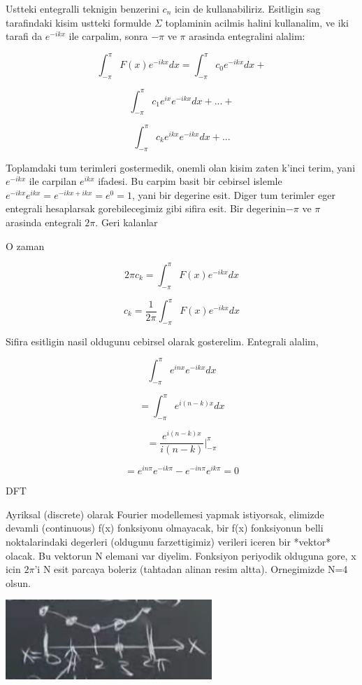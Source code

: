 \documentclass[12pt,fleqn]{article}\usepackage{../common}
\begin{document}
Ustteki entegralli teknigin benzerini $c_n$ icin de
kullanabiliriz. Esitligin sag tarafindaki kisim ustteki formulde
$\Sigma$ toplaminin acilmis halini kullanalim, ve iki tarafi da
$e^{-ikx}$ ile carpalim, sonra $-\pi$ ve $\pi$ arasinda entegralini
alalim:

$$ \int_{-\pi}^{\pi}F(x)e^{-ikx}dx = \int_{-\pi}^{\pi}c_0e^{-ikx}dx + $$

$$ \int_{-\pi}^{\pi}c_1e^{ix}e^{-ikx}dx + ... +  $$

$$ \int_{-\pi}^{\pi}c_ke^{ikx}e^{-ikx}dx + ... $$

Toplamdaki tum terimleri gostermedik, onemli olan kisim zaten k'inci terim, yani
$e^{-ikx}$ ile carpilan $e^{ikx}$ ifadesi. Bu carpim basit bir cebirsel islemle
$e^{-ikx}e^{ikx} = e^{-ikx + ikx} = e^{0} = 1$, yani bir degerine esit. Diger
tum terimler eger entegrali hesaplarsak gorebilecegimiz gibi sifira esit. Bir
degerinin$-\pi$ ve $\pi$ arasinda entegrali $2\pi$. Geri kalanlar

O zaman

$$ 2\pi c_k = \int_{-\pi}^{\pi}F(x)e^{-ikx}dx $$

$$ c_k = \frac{1}{2\pi}\int_{-\pi}^{\pi}F(x)e^{-ikx}dx $$

Sifira esitligin nasil oldugunu cebirsel olarak gosterelim. Entegrali alalim,

$$ \int_{-\pi}^{\pi}e^{inx}e^{-ikx}dx $$

$$ = \int_{-\pi}^{\pi}e^{i(n-k)x}dx $$

$$ = \frac{e^{i(n-k)x}}{i(n-k)} \bigg|_{-\pi}^{\pi}  $$

$$ = e^{in\pi}e^{-ik\pi} - e^{-in\pi}e^{ik\pi} = 0 $$

DFT

Ayriksal (discrete) olarak Fourier modellemesi yapmak istiyorsak, elimizde
devamli (continuous) f(x) fonksiyonu olmayacak, bir f(x) fonksiyonun belli
noktalarindaki degerleri (oldugunu farzettigimiz) verileri iceren bir 
*vektor* olacak. Bu vektorun N elemani var diyelim. Fonksiyon periyodik
olduguna gore, x icin $2\pi$'i N esit parcaya boleriz (tahtadan alinan resim
altta). Ornegimizde N=4 olsun.

\includegraphics[height=3cm]{four.png}
\end{document}
